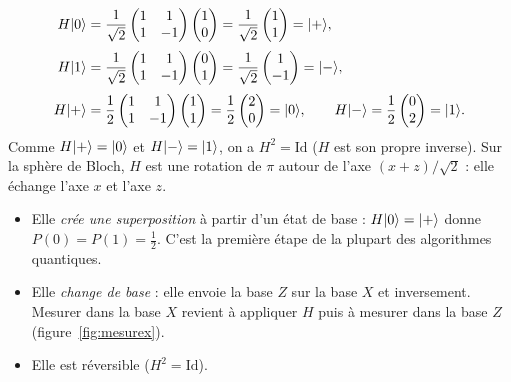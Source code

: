 \begin{align*}
  H|0\rangle&=\frac{1}{\sqrt2}\begin{pmatrix}1 & 1\\ 1 & -1\end{pmatrix}\begin{pmatrix}1\\ 0\end{pmatrix}
    =\frac{1}{\sqrt2}\begin{pmatrix}1\\ 1\end{pmatrix}=|+\rangle,\\[0.6ex]
  H|1\rangle&=\frac{1}{\sqrt2}\begin{pmatrix}1 & 1\\ 1 & -1\end{pmatrix}\begin{pmatrix}0\\ 1\end{pmatrix}
    =\frac{1}{\sqrt2}\begin{pmatrix}1\\ -1\end{pmatrix}=|-\rangle,\\[0.6ex]
  H|+\rangle&=\frac{1}{2}\begin{pmatrix}1 & 1\\ 1 & -1\end{pmatrix}\begin{pmatrix}1\\ 1\end{pmatrix}
    =\frac{1}{2}\begin{pmatrix}2\\ 0\end{pmatrix}=|0\rangle,\qquad
  H|-\rangle=\frac{1}{2}\begin{pmatrix}0\\ 2\end{pmatrix}=|1\rangle.
\end{align*}
Comme $H|+\rangle=|0\rangle$ et $H|-\rangle=|1\rangle$, on a $H^2=\mathrm{Id}$ ($H$ est son propre
inverse). Sur la sphère de Bloch, $H$ est une rotation de $\pi$ autour de l'axe
$(x+z)/\sqrt2$ : elle échange l'axe $x$ et l'axe $z$.

\begin{remarque}
\begin{itemize}[nosep]
  \item Elle \emph{crée une superposition} à partir d'un état de base :
        $H|0\rangle=|+\rangle$ donne $P(0)=P(1)=\frac12$. C'est la première étape de
        la plupart des algorithmes quantiques.
  \item Elle \emph{change de base} : elle envoie la base $Z$ sur la base $X$ et
        inversement. Mesurer dans la base $X$ revient à appliquer $H$ puis à mesurer
        dans la base $Z$ (figure~\ref{fig:mesurex}).
  \item Elle est réversible ($H^2=\mathrm{Id}$).
\end{itemize}
\end{remarque}

